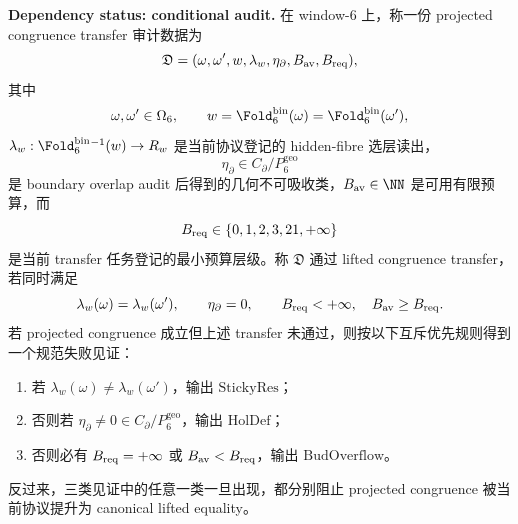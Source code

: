\begin{proposition}\label{distill:euclid_elements-lifted_congruence_and_residual_rigidity_families-window6-congruence-transfer-trichotomy}
\textbf{Dependency status: conditional audit.}
在 window-\(6\) 上，称一份 projected congruence transfer 审计数据为
\[
\mathfrak D=(\omega,\omega',w,\lambda_w,\eta_\partial,B_{\rm av},B_{\rm req}),
\]
其中
\[
\omega,\omega'\in\Omega_6,\qquad
w=\Fold_6^{\mathrm{bin}}(\omega)=\Fold_6^{\mathrm{bin}}(\omega'),
\]
\(\lambda_w:\Fold_6^{\mathrm{bin}}{}^{-1}(w)\to R_w\) 是当前协议登记的 hidden-fibre 选层读出，
\[
\eta_\partial\in C_{\partial}/P_6^{\mathrm{geo}}
\]
是 boundary overlap audit 后得到的几何不可吸收类，\(B_{\rm av}\in\NN\) 是可用有限预算，而
\[
B_{\rm req}\in\{0,1,2,3,21,+\infty\}
\]
是当前 transfer 任务登记的最小预算层级。称 \(\mathfrak D\) 通过 lifted congruence transfer，若同时满足
\[
\lambda_w(\omega)=\lambda_w(\omega'),\qquad
\eta_\partial=0,\qquad
B_{\rm req}<+\infty,\quad B_{\rm av}\ge B_{\rm req}.
\]
若 projected congruence 成立但上述 transfer 未通过，则按以下互斥优先规则得到一个规范失败见证：
\begin{enumerate}
  \item 若 \(\lambda_w(\omega)\ne\lambda_w(\omega')\)，输出 \(\mathrm{StickyRes}\)；
  \item 否则若 \(\eta_\partial\ne0\in C_{\partial}/P_6^{\mathrm{geo}}\)，输出 \(\mathrm{HolDef}\)；
  \item 否则必有 \(B_{\rm req}=+\infty\) 或 \(B_{\rm av}<B_{\rm req}\)，输出 \(\mathrm{BudOverflow}\)。
\end{enumerate}
反过来，三类见证中的任意一类一旦出现，都分别阻止 projected congruence 被当前协议提升为 canonical lifted equality。
\end{proposition}

